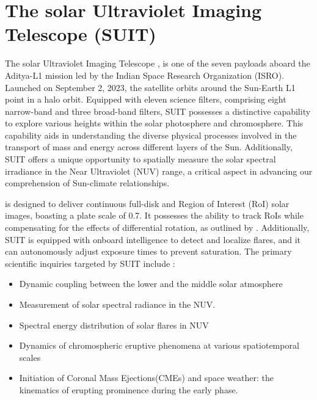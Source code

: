 \section{The solar Ultraviolet Imaging Telescope (SUIT)}\label{sec:suit}

The solar Ultraviolet Imaging Telescope \citep[SUIT;][]{ghosh16,article}, is one of the seven payloads aboard the Aditya-L1 mission \citep{adityal1, aditya} led by the Indian Space Research Organization (ISRO). Launched on September 2, 2023, the satellite orbits around the Sun-Earth L1 point in a halo orbit. Equipped with eleven science filters, comprising eight narrow-band and three broad-band filters, SUIT possesses a distinctive capability to explore various heights within the solar photosphere and chromosphere. This capability aids in understanding the diverse physical processes involved in the transport of mass and energy across different layers of the Sun. Additionally, SUIT offers a unique opportunity to spatially measure the solar spectral irradiance in the Near Ultraviolet (NUV) range, a critical aspect in advancing our comprehension of Sun-climate relationships.

{\suit} is designed to deliver continuous full-disk and Region of Interest (RoI) solar images, boasting a plate scale of 0.7{\arcsec}. It possesses the ability to track RoIs while compensating for the effects of differential rotation, as outlined by \cite{suit_algo}. Additionally, SUIT is equipped with onboard intelligence to detect and localize flares, and it can autonomously adjust exposure times to prevent saturation. The primary scientific inquiries targeted by SUIT include \citep{suit_main}:

\begin{itemize}
    \item Dynamic coupling between the lower and the middle solar atmosphere
    \item Measurement of solar spectral radiance in the NUV.
    \item Spectral energy distribution of solar flares in NUV
    \item Dynamics of chromospheric eruptive phenomena at various spatiotemporal scales
    \item Initiation of Coronal Mass Ejections(CMEs) and space weather: the kinematics of erupting prominence during the early phase.
\end{itemize}

